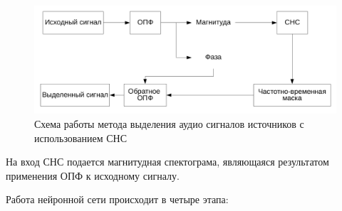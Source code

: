 \begin{figure}
	\centering
	\includegraphics[width=\textwidth]{inc/img/CNN}
	\caption{Схема работы метода выделения аудио сигналов источников с использованием СНС}
	\label{anal:CNN}
\end{figure}

На вход СНС подается магнитудная спектограма, являющаяся результатом применения ОПФ к исходному сигналу. 

Работа нейронной сети происходит в четыре этапа:

